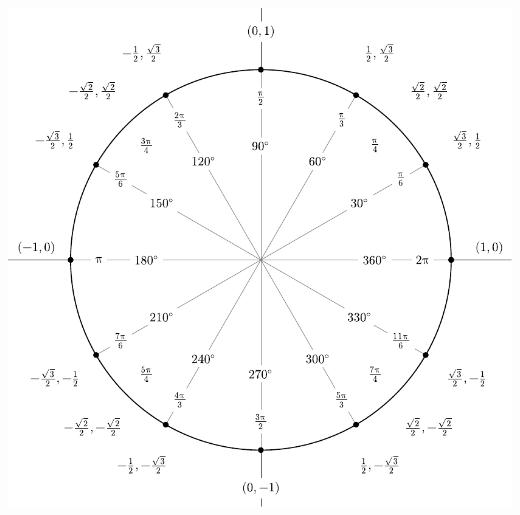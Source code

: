 \documentclass[a4paper,10pt]{article}
\begin{document}
\begin{center}
  \includegraphics[width=\linewidth]{degrees_circle.pdf}
\end{center}
\end{document}
